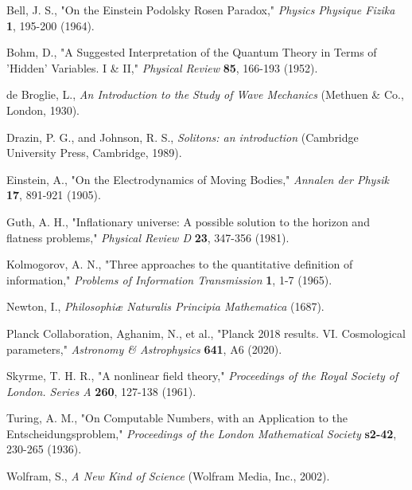\documentclass[11pt, a4paper]{article}
\begin{document}
\begin{thebibliography}{99} %

Bell, J. S., "On the Einstein Podolsky Rosen Paradox," \textit{Physics Physique Fizika} \textbf{1}, 195-200 (1964).

Bohm, D., "A Suggested Interpretation of the Quantum Theory in Terms of 'Hidden' Variables. I \& II," \textit{Physical Review} \textbf{85}, 166-193 (1952).

de Broglie, L., \textit{An Introduction to the Study of Wave Mechanics} (Methuen \& Co., London, 1930).

Drazin, P. G., and Johnson, R. S., \textit{Solitons: an introduction} (Cambridge University Press, Cambridge, 1989).

Einstein, A., "On the Electrodynamics of Moving Bodies," \textit{Annalen der Physik} \textbf{17}, 891-921 (1905).

Guth, A. H., "Inflationary universe: A possible solution to the horizon and flatness problems," \textit{Physical Review D} \textbf{23}, 347-356 (1981).

Kolmogorov, A. N., "Three approaches to the quantitative definition of information," \textit{Problems of Information Transmission} \textbf{1}, 1-7 (1965).

Newton, I., \textit{Philosophiæ Naturalis Principia Mathematica} (1687).

Planck Collaboration, Aghanim, N., et al., "Planck 2018 results. VI. Cosmological parameters," \textit{Astronomy \& Astrophysics} \textbf{641}, A6 (2020).

Skyrme, T. H. R., "A nonlinear field theory," \textit{Proceedings of the Royal Society of London. Series A} \textbf{260}, 127-138 (1961).

Turing, A. M., "On Computable Numbers, with an Application to the Entscheidungsproblem," \textit{Proceedings of the London Mathematical Society} \textbf{s2-42}, 230-265 (1936).

Wolfram, S., \textit{A New Kind of Science} (Wolfram Media, Inc., 2002).

\end{thebibliography}
\end{document}
